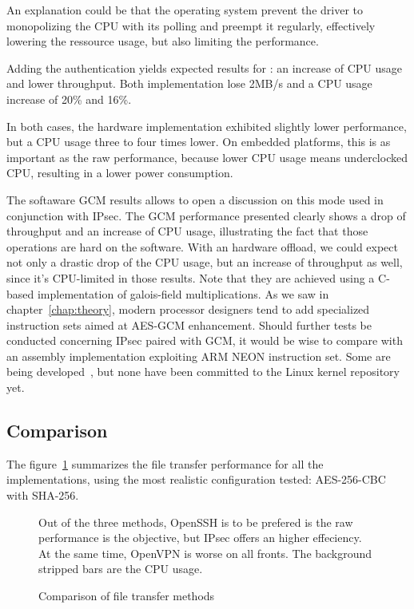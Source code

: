 \noindent An explanation could be that the operating system prevent the driver to monopolizing the CPU with its polling and preempt it regularly, effectively lowering the ressource usage, but also limiting the performance.

Adding the authentication yields expected results for : an increase of CPU usage and lower throughput.
Both implementation lose 2MB/s and a CPU usage increase of 20\% and 16\%.

In both cases, the hardware implementation exhibited slightly lower performance, but a CPU usage three to four times lower.
On embedded platforms, this is as important as the raw performance, because lower CPU usage means underclocked CPU, resulting in a lower power consumption.

The softaware GCM results allows to open a discussion on this mode used in conjunction with IPsec.
The GCM performance presented clearly shows a drop of throughput and an increase of CPU usage, illustrating the fact that those operations are hard on the software.
With an hardware offload, we could expect not only a drastic drop of the CPU usage, but an increase of throughput as well, since it's CPU-limited in those results.
Note that they are achieved using a C-based implementation of galois-field multiplications.
As we saw in chapter~\ref{chap:theory}, modern processor designers tend to add specialized instruction sets aimed at AES-GCM enhancement.
Should further tests be conducted concerning IPsec paired with GCM, it would be wise to compare with an assembly implementation exploiting ARM NEON instruction set.
Some are being developed~\cite{Conrado2013,Danilo2013}, but none have been committed to the Linux kernel repository yet.


\subsection{Comparison}
The figure~\ref{fig:ftp-bench-comparison} summarizes the file transfer performance for all the implementations, using the most realistic configuration tested: AES-256-CBC with SHA-256.
\begin{figure}[ht]

\caption{Comparison of file transfer methods}{Out of the three methods, OpenSSH is to be prefered is the raw performance is the objective, but IPsec offers an higher effeciency. At the same time, OpenVPN is worse on all fronts. The background stripped bars are the CPU usage.}
\label{fig:ftp-bench-comparison}
\end{figure}

